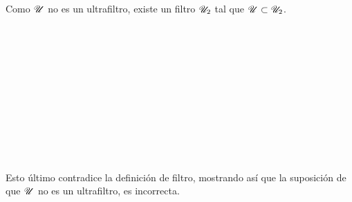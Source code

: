 \begin{demo}[i]
  Como $\mathscr{U}$ no es un ultrafiltro, existe un filtro $\mathscr{U}_2$ tal que
  $\mathscr{U} \subset \mathscr{U}_2$.
  \begin{longderivation}
      \\
    \equiv\\
      \\
    \\
      \\
    \\
      \\
    \equiv\\
      \\
    \\
  \end{longderivation}
  Esto último contradice la definición de filtro, mostrando así que la
  suposición de que $\mathscr{U}$ no es un ultrafiltro, es incorrecta.
\end{demo}
\begin{demo}[ii]
  
\end{demo}
